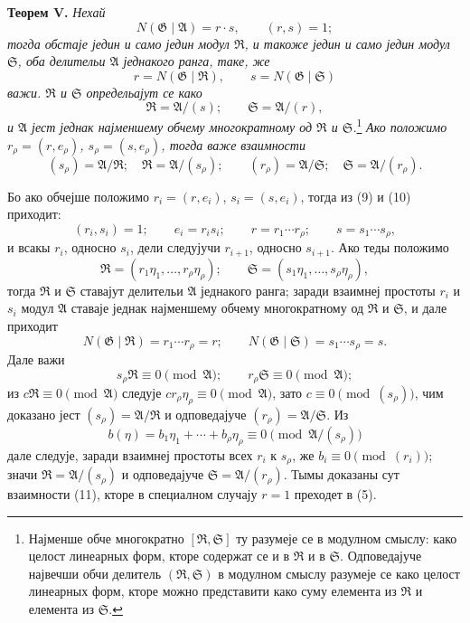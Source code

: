 \documentclass[11pt]{article}
\providecommand{\Amod}{\mathfrak A}
\providecommand{\Gmod}{\mathfrak G}
\providecommand{\Rmod}{\mathfrak R}
\providecommand{\Smod}{\mathfrak S}
\providecommand{\zero}[1]{\equiv 0\pmod{#1}}
\providecommand{\Norm}{N}
\begin{document}
\medskip
\noindent\textbf{Теорем V.} \emph{Нехай}
\begin{equation}
 \Norm(\Gmod\mid\Amod)=r\cdot s,\qquad (r,s)=1;
\tag{10}
\end{equation}
\emph{тогда обстаје једин и само једин модул $\Rmod$, и такоже једин и само једин модул $\Smod$, оба делительи $\Amod$ једнакого ранга, таке, же}
\[
 r=\Norm(\Gmod\mid\Rmod),\qquad s=\Norm(\Gmod\mid\Smod)
\]
\emph{важи. $\Rmod$ и $\Smod$ определьајут се како}
\[
 \Rmod=\Amod/(s);\qquad \Smod=\Amod/(r),
\]
\emph{и $\Amod$ јест једнак најменшему обчему многократному од $\Rmod$ и $\Smod$.}\footnote{Најменше обче многократно $[\Rmod,\Smod]$ ту разумеје се в модулном смыслу: како целост линеарных форм, кторе содержат се и в $\Rmod$ и в $\Smod$. Одповедајуче највечши обчи делитель $(\Rmod,\Smod)$ в модулном смыслу разумеје се како целост линеарных форм, кторе можно представити како суму елемента из $\Rmod$ и елемента из $\Smod$.}
\emph{Ако положимо $r_\rho=(r,e_\rho)$, $s_\rho=(s,e_\rho)$, тогда важе взаимности}
\begin{equation}
 (s_\rho)=\Amod/\Rmod;\quad \Rmod=\Amod/(s_\rho);
 \qquad
 (r_\rho)=\Amod/\Smod;\quad \Smod=\Amod/(r_\rho).
\tag{11}
\end{equation}

Бо ако обчејше положимо $r_i=(r,e_i)$, $s_i=(s,e_i)$, тогда из (9) и (10) приходит:
\[
 (r_i,s_i)=1;\qquad e_i=r_is_i;\qquad r=r_1\cdots r_\rho;\qquad s=s_1\cdots s_\rho,
\]
и всакы $r_i$, односно $s_i$, дели следујучи $r_{i+1}$, односно $s_{i+1}$. Ако теды положимо
\[
 \Rmod=(r_1\eta_1,\ldots,r_\rho\eta_\rho);\qquad
 \Smod=(s_1\eta_1,\ldots,s_\rho\eta_\rho),
\]
тогда $\Rmod$ и $\Smod$ ставајут делительи $\Amod$ једнакого ранга; заради взаимнеј простоты $r_i$ и $s_i$ модул $\Amod$ ставаје једнак најменшему обчему многократному од $\Rmod$ и $\Smod$, и дале приходит
\[
 \Norm(\Gmod\mid\Rmod)=r_1\cdots r_\rho=r;\qquad
 \Norm(\Gmod\mid\Smod)=s_1\cdots s_\rho=s.
\]
Дале важи
\[
 s_\rho\Rmod\zero{\Amod};\qquad r_\rho\Smod\zero{\Amod};
\]
из $c\Rmod\zero{\Amod}$ следује $cr_\rho\eta_\rho\zero{\Amod}$, зато $c\zero{(s_\rho)}$, чим доказано јест $(s_\rho)=\Amod/\Rmod$ и одповедајуче $(r_\rho)=\Amod/\Smod$. Из
\[
 b(\eta)=b_1\eta_1+\cdots+b_\rho\eta_\rho\zero{\Amod/(s_\rho)}
\]
дале следује, заради взаимнеј простоты всех $r_i$ к $s_\rho$, же $b_i\zero{(r_i)}$; значи $\Rmod=\Amod/(s_\rho)$ и одповедајуче $\Smod=\Amod/(r_\rho)$. Тымы доказаны сут взаимности (11), кторе в специалном случају $r=1$ преходет в (5).
\end{document}
